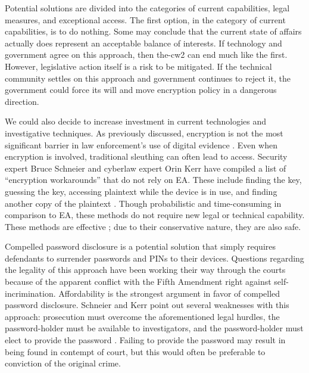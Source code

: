 \documentclass[conference]{IEEEtran}
\begin{document}
Potential solutions are divided into the categories of current capabilities, legal measures, and exceptional access. The
first option, in the category of current capabilities, is to do nothing. Some may conclude that the current state of
affairs actually does represent an acceptable balance of interests. If technology and government agree on this approach,
then \ac{the-cw2} can end much like the first. However, legislative action itself is a risk to be mitigated. If the
technical community settles on this approach and government continues to reject it, the government could force its will
and move encryption policy in a dangerous direction.

We could also decide to increase investment in current technologies and investigative techniques. As previously
discussed, encryption is not the most significant barrier in law enforcement's use of digital evidence
\cite{carter_2018}. Even when encryption is involved, traditional sleuthing can often lead to access. Security expert
Bruce Schneier and cyberlaw expert Orin Kerr have compiled a list of ``encryption workarounds'' that do not rely on
\ac{EA}. These include finding the key, guessing the key, accessing plaintext while the device is in use, and finding
another copy of the plaintext \cite{kerr_encryption_2017}. Though probabilistic and time-consuming in comparison to
\ac{EA}, these methods do not require new legal or technical capability. These methods are effective
\cite{greenberg_2018}; due to their conservative nature, they are also safe.

Compelled password disclosure is a potential solution that simply requires defendants to surrender passwords and
\acp{PIN} to their devices. Questions regarding the legality of this approach have been working their way through the
courts \cite{bittenbender_2019} \cite{sobel_2019} because of the apparent conflict with the Fifth Amendment right
against self-incrimination. Affordability is the strongest argument in favor of compelled password disclosure. Schneier
and Kerr point out several weaknesses with this approach: prosecution must overcome the aforementioned legal hurdles,
the password-holder must be available to investigators, and the password-holder must elect to provide the password
\cite{kerr_encryption_2017}. Failing to provide the password may result in being found in contempt of court, but this
would often be preferable to conviction of the original crime.
\end{document}
